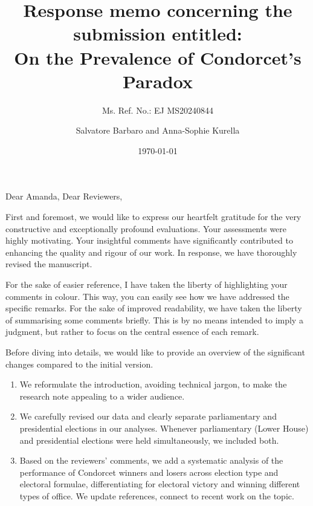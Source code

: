 \documentclass[a4paper, 12pt]{scrartcl}
\title{{\small Response memo concerning the submission entitled:} \\ On the Prevalence of Condorcet's Paradox }
\subtitle{Ms. Ref. No.: EJ MS20240844}
\author{Salvatore Barbaro and Anna-Sophie Kurella}
\date{\today}
\theoremstyle{break}
\begin{document}
\maketitle

\linenumbers

\noindent Dear Amanda, Dear Reviewers,


First and foremost, we would like to express our heartfelt gratitude for the very constructive and exceptionally profound evaluations. Your assessments were highly motivating. Your insightful comments have significantly contributed to enhancing the quality and rigour of our work. In response, we have thoroughly revised the manuscript.

For the sake of easier reference, I have taken the liberty of highlighting your comments in colour. This way, you can easily see how we have addressed the specific remarks. For the sake of improved readability, we have taken the liberty of summarising some comments briefly. This is by no means intended to imply a judgment, but rather to focus on the central essence of each remark.

Before diving into details, we would like to provide an overview of the significant changes compared to the initial version.
\begin{enumerate}
    \item We reformulate the introduction, avoiding technical jargon, to make the research note appealing to a wider audience.
	\item We carefully revised our data and clearly separate parliamentary and presidential elections in our analyses. Whenever parliamentary (Lower House) and presidential elections were held simultaneously, we included both. 
    \item Based on the reviewers' comments, we add a systematic analysis of the performance of Condorcet winners and losers across election type and electoral formulae, differentiating for electoral victory and winning different types of office.
    \ite We update references, connect to recent work on the topic.
\end{enumerate}
\end{document}
